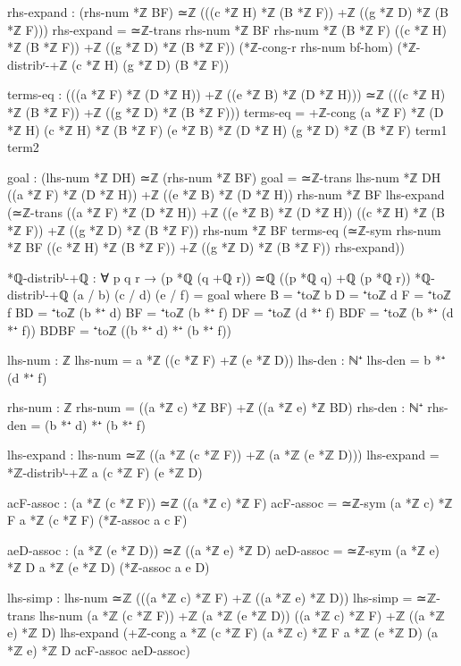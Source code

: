 \documentclass[11pt,a4paper]{book}
\begin{document}
\begin{code}
    rhs-expand : (rhs-num *ℤ BF) ≃ℤ (((c *ℤ H) *ℤ (B *ℤ F)) +ℤ ((g *ℤ D) *ℤ (B *ℤ F)))
    rhs-expand = ≃ℤ-trans {rhs-num *ℤ BF} {rhs-num *ℤ (B *ℤ F)}
                  {((c *ℤ H) *ℤ (B *ℤ F)) +ℤ ((g *ℤ D) *ℤ (B *ℤ F))}
                  (*ℤ-cong-r rhs-num bf-hom)
                  (*ℤ-distribʳ-+ℤ (c *ℤ H) (g *ℤ D) (B *ℤ F))

    terms-eq : (((a *ℤ F) *ℤ (D *ℤ H)) +ℤ ((e *ℤ B) *ℤ (D *ℤ H))) ≃ℤ 
               (((c *ℤ H) *ℤ (B *ℤ F)) +ℤ ((g *ℤ D) *ℤ (B *ℤ F)))
    terms-eq = +ℤ-cong {(a *ℤ F) *ℤ (D *ℤ H)} {(c *ℤ H) *ℤ (B *ℤ F)}
                       {(e *ℤ B) *ℤ (D *ℤ H)} {(g *ℤ D) *ℤ (B *ℤ F)}
                       term1 term2

    goal : (lhs-num *ℤ DH) ≃ℤ (rhs-num *ℤ BF)
    goal = ≃ℤ-trans {lhs-num *ℤ DH} 
             {((a *ℤ F) *ℤ (D *ℤ H)) +ℤ ((e *ℤ B) *ℤ (D *ℤ H))}
             {rhs-num *ℤ BF}
             lhs-expand
             (≃ℤ-trans {((a *ℤ F) *ℤ (D *ℤ H)) +ℤ ((e *ℤ B) *ℤ (D *ℤ H))}
                       {((c *ℤ H) *ℤ (B *ℤ F)) +ℤ ((g *ℤ D) *ℤ (B *ℤ F))}
                       {rhs-num *ℤ BF}
                       terms-eq
                       (≃ℤ-sym {rhs-num *ℤ BF} 
                               {((c *ℤ H) *ℤ (B *ℤ F)) +ℤ ((g *ℤ D) *ℤ (B *ℤ F))}
                               rhs-expand))

*ℚ-distribˡ-+ℚ : ∀ p q r → (p *ℚ (q +ℚ r)) ≃ℚ ((p *ℚ q) +ℚ (p *ℚ r))
*ℚ-distribˡ-+ℚ (a / b) (c / d) (e / f) = goal
  where
    B = ⁺toℤ b
    D = ⁺toℤ d
    F = ⁺toℤ f
    BD = ⁺toℤ (b *⁺ d)
    BF = ⁺toℤ (b *⁺ f)
    DF = ⁺toℤ (d *⁺ f)
    BDF = ⁺toℤ (b *⁺ (d *⁺ f))
    BDBF = ⁺toℤ ((b *⁺ d) *⁺ (b *⁺ f))
    
    lhs-num : ℤ
    lhs-num = a *ℤ ((c *ℤ F) +ℤ (e *ℤ D))
    lhs-den : ℕ⁺
    lhs-den = b *⁺ (d *⁺ f)
    
    rhs-num : ℤ
    rhs-num = ((a *ℤ c) *ℤ BF) +ℤ ((a *ℤ e) *ℤ BD)
    rhs-den : ℕ⁺
    rhs-den = (b *⁺ d) *⁺ (b *⁺ f)

    lhs-expand : lhs-num ≃ℤ ((a *ℤ (c *ℤ F)) +ℤ (a *ℤ (e *ℤ D)))
    lhs-expand = *ℤ-distribˡ-+ℤ a (c *ℤ F) (e *ℤ D)

    acF-assoc : (a *ℤ (c *ℤ F)) ≃ℤ ((a *ℤ c) *ℤ F)
    acF-assoc = ≃ℤ-sym {(a *ℤ c) *ℤ F} {a *ℤ (c *ℤ F)} (*ℤ-assoc a c F)
    
    aeD-assoc : (a *ℤ (e *ℤ D)) ≃ℤ ((a *ℤ e) *ℤ D)
    aeD-assoc = ≃ℤ-sym {(a *ℤ e) *ℤ D} {a *ℤ (e *ℤ D)} (*ℤ-assoc a e D)

    lhs-simp : lhs-num ≃ℤ (((a *ℤ c) *ℤ F) +ℤ ((a *ℤ e) *ℤ D))
    lhs-simp = ≃ℤ-trans {lhs-num} {(a *ℤ (c *ℤ F)) +ℤ (a *ℤ (e *ℤ D))} 
                {((a *ℤ c) *ℤ F) +ℤ ((a *ℤ e) *ℤ D)}
                lhs-expand
                (+ℤ-cong {a *ℤ (c *ℤ F)} {(a *ℤ c) *ℤ F} 
                        {a *ℤ (e *ℤ D)} {(a *ℤ e) *ℤ D}
                        acF-assoc aeD-assoc)


\end{code}
\end{document}
